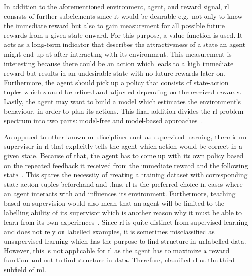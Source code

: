 \documentclass[draft,final]{vutinfth} %
\newcommand{\p}[1]{see p. #1}
\begin{document}
    In addition to the aforementioned environment, agent, and reward signal, \gls{rl} consists of further subelements since it would be desirable e.g.\ not only to know the immediate reward but also to gain measurement for all possible future rewards from a given state onward.
    For this purpose, a value function is used.
    It acts as a long-term indicator that describes the attractiveness of a state an agent might end up at after interacting with its environment.
    This measurement is interesting because there could be an action which leads to a high immediate reward but results in an undesirable state with no future rewards later on.
    Furthermore, the agent should pick up a policy that consists of state-action tuples which should be refined and adjusted depending on the received rewards.
    Lastly, the agent may want to build a model which estimates the environment's behaviour, in order to plan its actions.
    This final addition divides the \gls{rl} problem spectrum into two parts: model-free and model-based approaches~\citep[6f]{sutton_reinforcement_2018}.


    As opposed to other known \gls{ml} disciplines such as supervised learning, there is no supervisor in \gls{rl} that explicitly tells the agent which action would be correct in a given state.
    Because of that, the agent has to come up with its own policy based on the repeated feedback it received from the immediate reward and the following state~\citep{kaelbling_reinforcement_1996}.
    This spares the necessity of creating a training dataset with corresponding state-action tuples beforehand and thus, \gls{rl} is the preferred choice in cases where an agent interacts with and influences its environment.
    Furthermore, teaching based on supervision would also mean that an agent will be limited to the labelling ability of its supervisor which is another reason why it must be able to learn from its own experiences~.
    Since \gls{rl} is quite distinct from supervised learning and does not rely on labelled examples, it is sometimes misclassified as unsupervised learning which has the purpose to find structure in unlabelled data.
    However, this is not applicable for \gls{rl} as the agent has to maximize a reward function and not to find structure in data.
    Therefore, \citet[\p{2}]{sutton_reinforcement_2018} classified \gls{rl} as the third subfield of \gls{ml}.
\end{document}

